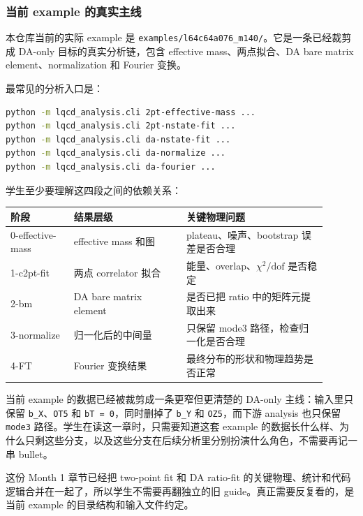 \documentclass[11pt,a4paper,fontset=fandol]{ctexart}
\begin{document}
\subsubsection{当前 example 的真实主线}

本仓库当前的实际 example 是 \lstinline|examples/l64c64a076_m140/|。它是一条已经裁剪成 DA-only 目标的真实分析链，包含 effective mass、两点拟合、DA bare matrix element、normalization 和 Fourier 变换。

最常见的分析入口是：

\begin{lstlisting}[language=bash]
python -m lqcd_analysis.cli 2pt-effective-mass ...
python -m lqcd_analysis.cli 2pt-nstate-fit ...
python -m lqcd_analysis.cli da-nstate-fit ...
python -m lqcd_analysis.cli da-normalize ...
python -m lqcd_analysis.cli da-fourier ...
\end{lstlisting}

学生至少要理解这四段之间的依赖关系：

\begin{center}
\begin{tabular}{p{0.18\linewidth}p{0.32\linewidth}p{0.40\linewidth}}
\toprule
阶段 & 结果层级 & 关键物理问题 \\
\midrule
0-effective-mass & effective mass 和图 & plateau、噪声、bootstrap 误差是否合理 \\
1-c2pt-fit & 两点 correlator 拟合 & 能量、overlap、$\chi^2/\mathrm{dof}$ 是否稳定 \\
2-bm & DA bare matrix element & 是否已把 ratio 中的矩阵元提取出来 \\
3-normalize & 归一化后的中间量 & 只保留 mode3 路径，检查归一化是否合理 \\
4-FT & Fourier 变换结果 & 最终分布的形状和物理趋势是否正常 \\
\bottomrule
\end{tabular}
\end{center}

当前 example 的数据已经被裁剪成一条更窄但更清楚的 DA-only 主线：输入里只保留 \lstinline|b_X|、\lstinline|OT5| 和 \lstinline|bT = 0|，同时删掉了 \lstinline|b_Y| 和 \lstinline|OZ5|，而下游 analysis 也只保留 \lstinline|mode3| 路径。学生在读这一章时，只需要知道这套 example 的数据长什么样、为什么只剩这些分支，以及这些分支在后续分析里分别扮演什么角色，不需要再记一串 bullet。

这份 Month 1 章节已经把 two-point fit 和 DA ratio-fit 的关键物理、统计和代码逻辑合并在一起了，所以学生不需要再翻独立的旧 guide。真正需要反复看的，是当前 example 的目录结构和输入文件约定。
\end{document}
